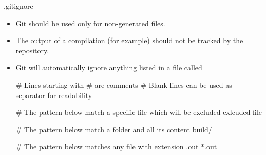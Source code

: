 \begin{frame}[fragile]{.gitignore}
  \begin{itemize}[<+->]
      \item Git should be used only for non-generated files.
      \item The output of a compilation (for example) should not be tracked by the repository.
      \item Git will automatically ignore anything listed in a file called 
      \begin{codeblock}
# Lines starting with # are comments
# Blank lines can be used as separator for readability

# The pattern below match a specific file which will be excluded
exlcuded-file

# The pattern below match a folder and all its content
build/

# The pattern below matches any file with extension .out
*.out
      \end{codeblock}
  \end{itemize}
\end{frame}

